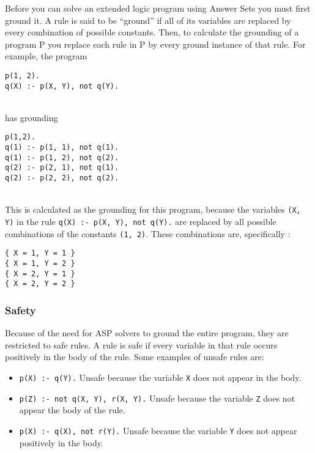 Before you can solve an extended logic program using Answer Sets you must first ground it. A rule is said to be ``ground'' if all of its variables are replaced by every combination of possible constants. Then, to calculate the grounding of a program P you replace each rule in P by every ground instance of that rule. For example, the program \\

\begin{lstlisting}
p(1, 2).
q(X) :- p(X, Y), not q(Y).
\end{lstlisting}
\mbox{}\\
has grounding \\

\begin{lstlisting}
p(1,2).
q(1) :- p(1, 1), not q(1).
q(1) :- p(1, 2), not q(2).
q(2) :- p(2, 1), not q(1).
q(2) :- p(2, 2), not q(2).
\end{lstlisting}
\mbox{}\\
This is calculated as the grounding for this program, because the variables \lstinline{(X, Y)} in the rule \lstinline{q(X) :- p(X, Y), not q(Y).} are replaced by all possible combinations of the constants \lstinline{(1, 2)}. These combinations are, specifically :\\%

\begin{lstlisting}
{ X = 1, Y = 1 }
{ X = 1, Y = 2 }
{ X = 2, Y = 1 }
{ X = 2, Y = 2 }
\end{lstlisting}

\subsubsection{Safety}

Because of the need for ASP solvers to ground the entire program, they are restricted to safe rules. A rule is safe if every variable in that rule occurs positively in the body of the rule. Some examples of unsafe rules are:

\begin{itemize}
\item \lstinline!p(X) :- q(Y).! Unsafe because the variable \lstinline!X! does not appear in the body. 
\item \lstinline!p(Z) :- not q(X, Y), r(X, Y).! Unsafe because the variable \lstinline!Z! does not appear the body of the rule.
\item \lstinline!p(X) :- q(X), not r(Y).! Unsafe because the variable \lstinline!Y! does not appear positively in the body.
\end{itemize}

